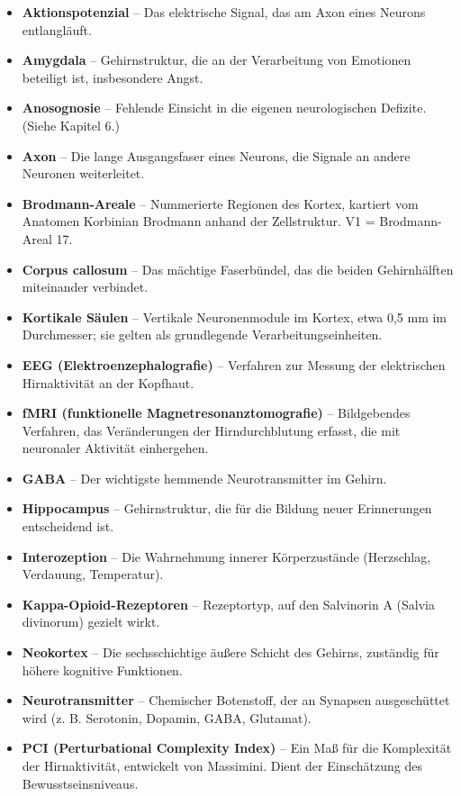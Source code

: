 \documentclass[11pt, twoside, openright]{book}
\begin{document}
\begin{itemize}
  \item \textbf{Aktionspotenzial} -- Das elektrische Signal, das am Axon eines Neurons entlangläuft.
  \item \textbf{Amygdala} -- Gehirnstruktur, die an der Verarbeitung von Emotionen beteiligt ist, insbesondere Angst.
  \item \textbf{Anosognosie} -- Fehlende Einsicht in die eigenen neurologischen Defizite. (Siehe Kapitel 6.)
  \item \textbf{Axon} -- Die lange Ausgangsfaser eines Neurons, die Signale an andere Neuronen weiterleitet.
  \item \textbf{Brodmann-Areale} -- Nummerierte Regionen des Kortex, kartiert vom Anatomen Korbinian Brodmann anhand der Zellstruktur. V1 = Brodmann-Areal 17.
  \item \textbf{Corpus callosum} -- Das mächtige Faserbündel, das die beiden Gehirnhälften miteinander verbindet.
  \item \textbf{Kortikale Säulen} -- Vertikale Neuronenmodule im Kortex, etwa 0,5 mm im Durchmesser; sie gelten als grundlegende Verarbeitungseinheiten.
  \item \textbf{EEG (Elektroenzephalografie)} -- Verfahren zur Messung der elektrischen Hirnaktivität an der Kopfhaut.
  \item \textbf{fMRI (funktionelle Magnetresonanztomografie)} -- Bildgebendes Verfahren, das Veränderungen der Hirndurchblutung erfasst, die mit neuronaler Aktivität einhergehen.
  \item \textbf{GABA} -- Der wichtigste hemmende Neurotransmitter im Gehirn.
  \item \textbf{Hippocampus} -- Gehirnstruktur, die für die Bildung neuer Erinnerungen entscheidend ist.
  \item \textbf{Interozeption} -- Die Wahrnehmung innerer Körperzustände (Herzschlag, Verdauung, Temperatur).
  \item \textbf{Kappa-Opioid-Rezeptoren} -- Rezeptortyp, auf den Salvinorin A (Salvia divinorum) gezielt wirkt.
  \item \textbf{Neokortex} -- Die sechsschichtige äußere Schicht des Gehirns, zuständig für höhere kognitive Funktionen.
  \item \textbf{Neurotransmitter} -- Chemischer Botenstoff, der an Synapsen ausgeschüttet wird (z. B. Serotonin, Dopamin, GABA, Glutamat).
  \item \textbf{PCI (Perturbational Complexity Index)} -- Ein Maß für die Komplexität der Hirnaktivität, entwickelt von Massimini. Dient der Einschätzung des Bewusstseinsniveaus.

\end{itemize}
\end{document}
